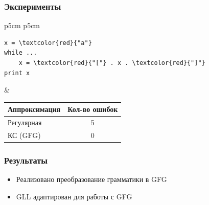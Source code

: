 \documentclass{beamer}
\begin{document}
\begin{frame}[fragile]
	\transwipe[direction=90]
	\frametitle{Эксперименты}
	\begin{table}
	\centering
		\begin{tabular}{p{5cm} p{5cm}}
			\begin{Verbatim}[commandchars=\\\{\}]
x = \textcolor{red}{"a"}
while ...
    x = \textcolor{red}{"["} . x . \textcolor{red}{"]"}
print x
			\end{Verbatim}
			&
			\begin{table}
				\centering
				\begin{tabular}{p{2.5cm} | c}
					Аппроксимация & Кол-во ошибок \\ \hline
					Регулярная & 5 \\ \hline
					КС (GFG) & 0
				\end{tabular}
			\end{table}
		\end{tabular}
	\end{table}
\end{frame}

\begin{frame}
	\transwipe[direction=90]
	\frametitle{Результаты}
	\begin{itemize}
		\item Реализовано преобразование грамматики в GFG
		\item GLL адаптирован для работы с GFG
	\end{itemize}
\end{frame}
\end{document}
